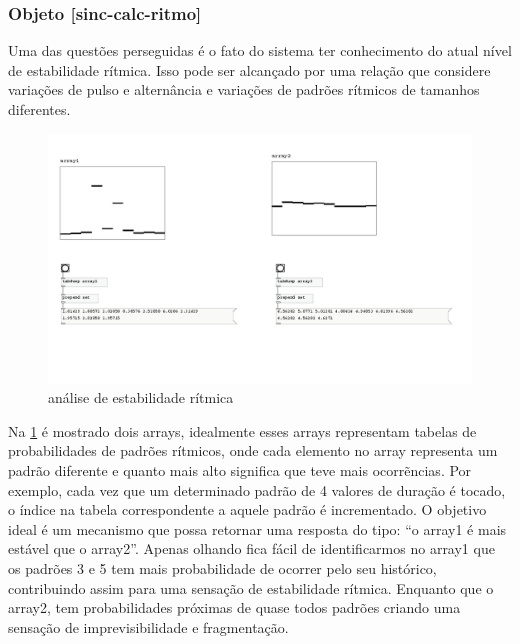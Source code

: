 \documentclass{ppgmus}
\begin{document}
% 



\subsubsection{Objeto [sinc-calc-ritmo]}

Uma das questões perseguidas é o fato do sistema ter conhecimento do atual nível de 
estabilidade rítmica. Isso pode ser alcançado por uma relação que considere variações
de pulso e alternância e variações de padrões rítmicos de tamanhos diferentes.

\begin{figure}
\includegraphics[scale=.6]{prot5a}
\caption{análise de estabilidade rítmica}
\label{prot5a}
\end{figure} 

Na \ref{prot5a} é mostrado dois arrays, idealmente esses arrays representam tabelas
de probabilidades de padrões rítmicos, onde cada elemento no array representa um
padrão diferente e quanto mais alto significa que teve mais ocorrẽncias.
Por exemplo, cada vez que um determinado padrão de 4 valores de duração é tocado, 
o índice na tabela correspondente a aquele padrão é incrementado. O objetivo ideal
é um mecanismo que possa retornar uma resposta do tipo:
``o array1 é mais estável que o array2''. Apenas olhando fica fácil de identificarmos
no array1 que os padrões 3 e 5 tem mais probabilidade de ocorrer pelo seu histórico,
contribuindo assim para uma sensação de estabilidade rítmica. Enquanto que o array2,
tem probabilidades próximas de quase todos padrões criando uma sensação de imprevisibilidade
e fragmentação.
\end{document}
